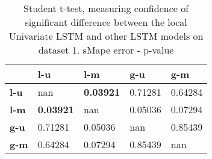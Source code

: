 \begin{table}[H]
\centering
\caption{Student t-test, measuring confidence of significant difference between the local Univariate LSTM and other LSTM models on dataset 1. sMape error - p-value}
\label{table:ttest-p-values-lstm-experiments-sMAPE-dataset-1}
\begin{tabular}{lllll}
\toprule
{} &               l-u &               l-m &      g-u &      g-m \\
\midrule
\textbf{l-u} &               nan &  \textbf{0.03921} &  0.71281 &  0.64284 \\
\textbf{l-m} &  \textbf{0.03921} &               nan &  0.05036 &  0.07294 \\
\textbf{g-u} &           0.71281 &           0.05036 &      nan &  0.85439 \\
\textbf{g-m} &           0.64284 &           0.07294 &  0.85439 &      nan \\
\bottomrule
\end{tabular}
\end{table}
